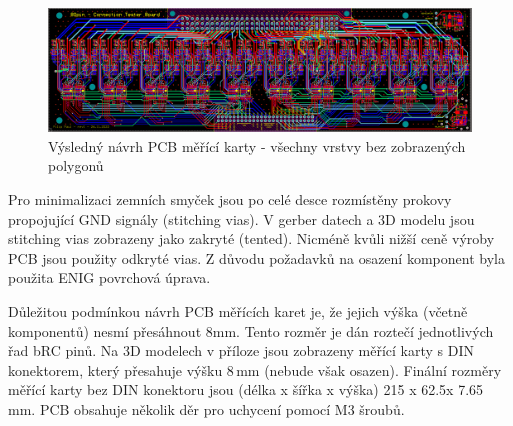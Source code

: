 \begin{figure}[ht!]
    \centering
    \includegraphics[width = 1\textwidth]{obrazky/all_layers_no_poly.png}
    \caption{Výsledný návrh PCB měřící karty - všechny vrstvy bez zobrazených polygonů}
    \label{fig:Všechny vrstvy bez polygonů}
\end{figure}
    
Pro minimalizaci zemních smyček jsou po celé desce rozmístěny prokovy propojující GND signály (stitching vias).
V gerber datech a 3D modelu jsou stitching vias zobrazeny jako zakryté (tented). Nicméně kvůli nižší ceně výroby PCB
jsou použity odkryté vias.
Z důvodu požadavků na osazení komponent byla použita ENIG povrchová úprava.\par

Důležitou podmínkou návrh PCB měřících karet je, že jejich výška (včetně komponentů) nesmí přesáhnout 8mm.
Tento rozměr je dán roztečí jednotlivých řad bRC pinů. Na 3D modelech v příloze jsou zobrazeny měřící karty
s DIN konektorem, který přesahuje výšku 8\,mm (nebude však osazen). Finální rozměry měřící karty bez DIN konektoru jsou
(délka x šířka x výška) 215 x 62.5x 7.65\,mm. PCB obsahuje několik děr pro uchycení pomocí M3 šroubů.
